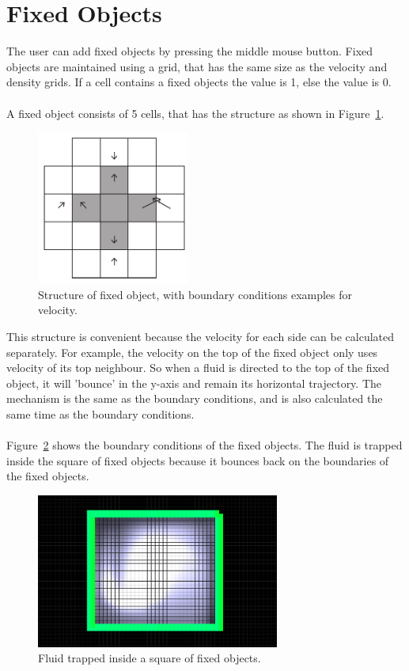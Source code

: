 \section{Fixed Objects}
The user can add fixed objects by pressing the middle mouse button.
Fixed objects are maintained using a grid, that has the same size as the velocity and density grids.
If a cell contains a fixed objects the value is 1, else the value is 0.\\
\\
A fixed object consists of 5 cells, that has the structure as shown in Figure~\ref{fig:fixedstructure}.

\begin{figure}[h]
    \centering
    \includegraphics[width=5cm]{img/fixedstructure.pdf}
    \caption{Structure of fixed object, with boundary conditions examples for velocity.}
    \label{fig:fixedstructure}
\end{figure}

\noindent This structure is convenient because the velocity for each side can be calculated separately.
For example, the velocity on the top of the fixed object only uses velocity of its top neighbour.
So when a fluid is directed to the top of the fixed object, it will 'bounce' in the y-axis and remain its horizontal trajectory.
The mechanism is the same as the boundary conditions, and is also calculated the same time as the boundary conditions.\\
\\
Figure~\ref{fig:fixed} shows the boundary conditions of the fixed objects. The fluid is trapped inside the square of fixed objects because it bounces back on the boundaries of the fixed objects.

\begin{figure}[H]
    \centering
    \includegraphics[width=8cm]{img/fixed.png}
    \caption{Fluid trapped inside a square of fixed objects.}
    \label{fig:fixed}
\end{figure}
